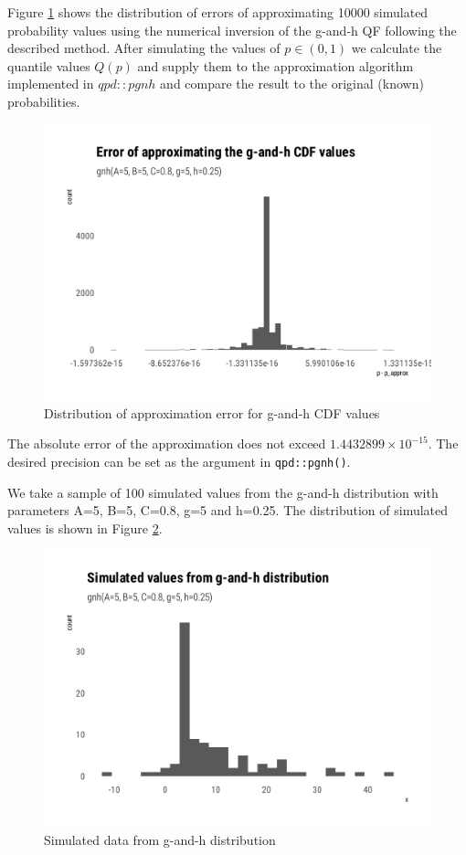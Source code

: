 \documentclass[
  12pt,
]{article}
\begin{document}
Figure \ref{fig:pgnk-error} shows the distribution of errors of approximating 10000 simulated probability values using the numerical inversion of the g-and-h QF following the described method. After simulating the values of \(p\in(0,1)\) we calculate the quantile values \(Q(p)\) and supply them to the approximation algorithm implemented in \(qpd::pgnh\) and compare the result to the original (known) probabilities.

\begin{figure}

{\centering \includegraphics[width=0.5\linewidth]{ilbm_article_files/figure-latex/pgnk-error-1} 

}

\caption{Distribution of approximation error for g-and-h CDF values}\label{fig:pgnk-error}
\end{figure}

The absolute error of the approximation does not exceed \ensuremath{1.4432899\times 10^{-15}}. The desired precision can be set as the argument in \texttt{qpd::pgnh()}.

We take a sample of 100 simulated values from the g-and-h distribution with parameters A=5, B=5, C=0.8, g=5 and h=0.25. The distribution of simulated values is shown in Figure \ref{fig:gnh-data}.

\begin{figure}

{\centering \includegraphics[width=0.5\linewidth]{ilbm_article_files/figure-latex/gnh-data-1} 

}

\caption{Simulated data from g-and-h distribution}\label{fig:gnh-data}
\end{figure}
\end{document}
